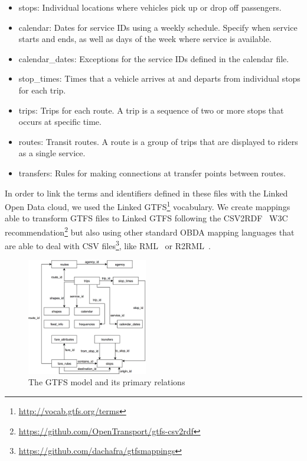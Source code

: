 \documentclass[sw]{iosart2x}
\begin{document}
	\begin{itemize}
		\item stops: Individual locations where vehicles pick up or drop off passengers.
		\item calendar: Dates for service IDs using a weekly schedule. Specify when service starts and ends, as well as days of the week where service is available.
		\item calendar\_dates: Exceptions for the service IDs defined in the calendar file.
		\item stop\_times: Times that a vehicle arrives at and departs from individual stops for each trip.
		\item trips: Trips for each route. A trip is a sequence of two or more stops that occurs at specific time.
		\item routes: Transit routes. A route is a group of trips that are displayed to riders as a single service.
		\item transfers: Rules for making connections at transfer points between routes.
	\end{itemize}
	
	In order to link the terms and identifiers defined in these files with the Linked Open Data cloud, we used the Linked GTFS\footnote{\url{http://vocab.gtfs.org/terms}} vocabulary. We create mappings able to transform GTFS files to Linked GTFS following the CSV2RDF~\cite{tennison2015model} W3C recommendation\footnote{\url{https://github.com/OpenTransport/gtfs-csv2rdf}} but also using other standard OBDA mapping languages that are able to deal with CSV files\footnote{\url{https://github.com/dachafra/gtfsmappings}}, like RML~\cite{dimou2014rml} or R2RML~\cite{das2012r2rml}. 
	
	\begin{figure}[t]
		\includegraphics[width=0.47\textwidth]{images/gtfsmodel.png}
		\caption{The GTFS model and its primary relations}\label{fig:gtfs}
	\end{figure}
	
\end{document}
